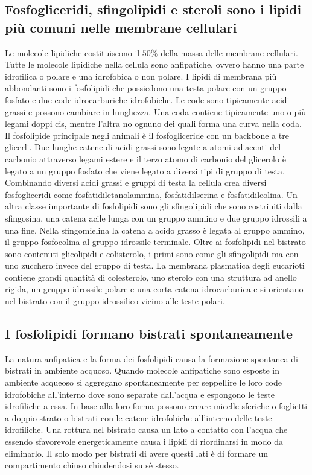 \subsection{Fosfogliceridi, sfingolipidi e steroli sono i lipidi pi\`u comuni nelle membrane cellulari}
Le molecole lipidiche costituiscono il $50\%$ della massa delle membrane cellulari. Tutte le molecole lipidiche nella cellula sono anfipatiche, ovvero
hanno una parte idrofilica o polare e una idrofobica o non polare. I lipidi di membrana pi\`u abbondanti sono i fosfolipidi che possiedono una testa
polare con un gruppo fosfato e due code idrocarburiche idrofobiche. Le code sono tipicamente acidi grassi e possono cambiare in lunghezza. Una coda
contiene tipicamente uno o pi\`u legami doppi cis, mentre l'altra no ognuno dei quali forma una curva nella coda. Il fosfolipide principale negli animali
\`e il fosfogliceride con un backbone a tre glicerli. Due lunghe catene di acidi grassi sono legate a atomi adiacenti del carbonio attraverso legami
estere e il terzo atomo di carbonio del glicerolo \`e legato a un gruppo fosfato che viene legato a diversi tipi di gruppo di testa. Combinando diversi
acidi grassi e gruppi di testa la cellula crea diversi fosfogliceridi come fosfatidiletanolammina, fosfatidilserina e fosfatidilcolina. Un altra classe
importante di fosfolipidi sono gli sfingolipidi che sono costriuiti dalla sfingosina, una catena acile lunga con un gruppo ammino  e due gruppo idrossili
a una fine. Nella sfingomielina la catena a acido grasso \`e legata al gruppo ammino, il gruppo fosfocolina al gruppo idrossile terminale. Oltre ai 
fosfolipidi nel bistrato sono contenuti glicolipidi e colisterolo, i primi sono come gli sfingolipidi ma con uno zucchero invece del gruppo di testa. 
La membrana plasmatica degli eucarioti contiene grandi quantit\`a di colesterolo, uno sterolo con una struttura ad anello rigida, un gruppo idrossile 
polare e una corta catena idrocarburica e si orientano nel bistrato con il gruppo idrossilico vicino alle teste polari. 
\subsection{I fosfolipidi formano bistrati spontaneamente}
La natura anfipatica e la forma dei fosfolipidi causa la formazione spontanea di bistrati in ambiente acquoso. Quando molecole anfipatiche sono esposte in
ambiente acqueoso si aggregano spontaneamente per seppellire le loro code idrofobiche all'interno dove sono separate dall'acqua e espongono le teste
idrofiliche a essa. In base alla loro forma possono creare micelle sferiche o foglietti a doppio strato o bistrati con le catene idrofobiche all'interno
delle teste idrofiliche. Una rottura nel bistrato causa un lato a contatto con l'acqua che essendo sfavorevole energeticamente causa i lipidi di 
riordinarsi in modo da eliminarlo. Il solo modo per bistrati di avere questi lati \`e di formare un compartimento chiuso chiudendosi su s\`e stesso. 
